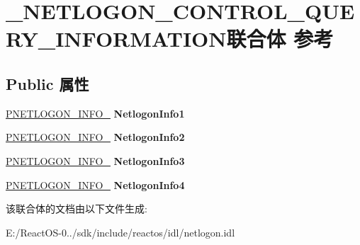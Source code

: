 \hypertarget{union___n_e_t_l_o_g_o_n___c_o_n_t_r_o_l___q_u_e_r_y___i_n_f_o_r_m_a_t_i_o_n}{}\section{\+\_\+\+N\+E\+T\+L\+O\+G\+O\+N\+\_\+\+C\+O\+N\+T\+R\+O\+L\+\_\+\+Q\+U\+E\+R\+Y\+\_\+\+I\+N\+F\+O\+R\+M\+A\+T\+I\+O\+N联合体 参考}
\label{union___n_e_t_l_o_g_o_n___c_o_n_t_r_o_l___q_u_e_r_y___i_n_f_o_r_m_a_t_i_o_n}
\subsection*{Public 属性}
\begin{DoxyCompactItemize}
\item 
\mbox{\label{union___n_e_t_l_o_g_o_n___c_o_n_t_r_o_l___q_u_e_r_y___i_n_f_o_r_m_a_t_i_o_n_a3e38db0dd74d847dcdfee5c812935cbc}} 
\hyperlink{struct___n_e_t_l_o_g_o_n___i_n_f_o__1}{P\+N\+E\+T\+L\+O\+G\+O\+N\+\_\+\+I\+N\+F\+O\+\_} {\bfseries Netlogon\+Info1}
\item 
\mbox{\label{union___n_e_t_l_o_g_o_n___c_o_n_t_r_o_l___q_u_e_r_y___i_n_f_o_r_m_a_t_i_o_n_a5d29520f2eed28fad0887af925b4a4f7}} 
\hyperlink{struct___n_e_t_l_o_g_o_n___i_n_f_o__2}{P\+N\+E\+T\+L\+O\+G\+O\+N\+\_\+\+I\+N\+F\+O\+\_} {\bfseries Netlogon\+Info2}
\item 
\mbox{\label{union___n_e_t_l_o_g_o_n___c_o_n_t_r_o_l___q_u_e_r_y___i_n_f_o_r_m_a_t_i_o_n_a0b77710cbf225aaac6b003a1a4d829aa}} 
\hyperlink{struct___n_e_t_l_o_g_o_n___i_n_f_o__3}{P\+N\+E\+T\+L\+O\+G\+O\+N\+\_\+\+I\+N\+F\+O\+\_} {\bfseries Netlogon\+Info3}
\item 
\mbox{\label{union___n_e_t_l_o_g_o_n___c_o_n_t_r_o_l___q_u_e_r_y___i_n_f_o_r_m_a_t_i_o_n_a23eb3cfd5fb16268bbc8e4b78f5f47a4}} 
\hyperlink{struct___n_e_t_l_o_g_o_n___i_n_f_o__4}{P\+N\+E\+T\+L\+O\+G\+O\+N\+\_\+\+I\+N\+F\+O\+\_} {\bfseries Netlogon\+Info4}
\end{DoxyCompactItemize}


该联合体的文档由以下文件生成\+:\begin{DoxyCompactItemize}
\item 
E\+:/\+React\+O\+S-\/0../sdk/include/reactos/idl/netlogon.\+idl\end{DoxyCompactItemize}
